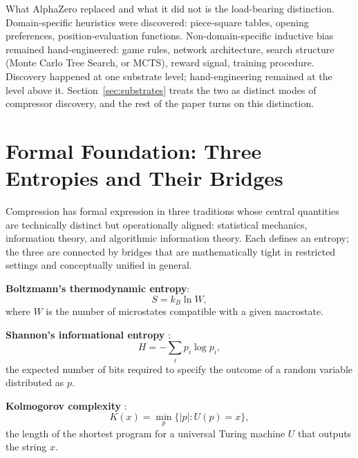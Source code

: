 \documentclass[11pt]{article}
\begin{document}
What AlphaZero replaced and what it did not is the load-bearing distinction. Domain-specific heuristics were discovered: piece-square tables, opening preferences, position-evaluation functions. Non-domain-specific inductive bias remained hand-engineered: game rules, network architecture, search structure (Monte Carlo Tree Search, or MCTS), reward signal, training procedure. Discovery happened at one substrate level; hand-engineering remained at the level above it. Section~\ref{sec:substrates} treats the two as distinct modes of compressor discovery, and the rest of the paper turns on this distinction.

\section{Formal Foundation: Three Entropies and Their Bridges}\label{sec:formal}

Compression has formal expression in three traditions whose central quantities are technically distinct but operationally aligned: statistical mechanics, information theory, and algorithmic information theory. Each defines an entropy; the three are connected by bridges that are mathematically tight in restricted settings and conceptually unified in general.

\textbf{Boltzmann's thermodynamic entropy}:
\begin{equation}
S = k_B \ln W,
\end{equation}
where $W$ is the number of microstates compatible with a given macrostate.

\textbf{Shannon's informational entropy} \citep{shannon1948}:
\begin{equation}
H = -\sum_i p_i \log p_i,
\end{equation}
the expected number of bits required to specify the outcome of a random variable distributed as $p$.

\textbf{Kolmogorov complexity} \citep{kolmogorov1965}:
\begin{equation}
K(x) = \min_p \{|p| : U(p) = x\},
\end{equation}
the length of the shortest program for a universal Turing machine $U$ that outputs the string $x$.
\end{document}
